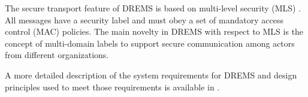 The secure transport feature of DREMS is based on multi-level security (MLS) \cite{BellLaPadula}. All messages have a security label and must obey a set of mandatory access control (MAC) policies. The main novelty in DREMS with respect to MLS is the concept of multi-domain labels \cite{OlinSibertLabels} to support secure communication among actors from different organizations.

A more detailed description of the system requirements for DREMS and design principles used to meet those requirements is available in \cite{DREMS13Software}.